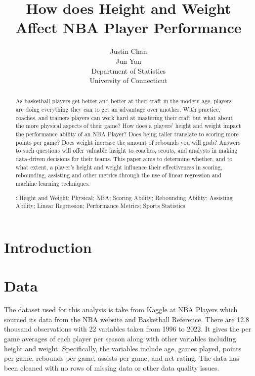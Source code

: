 \documentclass[12pt]{article}
\title{How does Height and Weight Affect NBA Player Performance}
\author{Justin Chan\\
	Jun Yan\\[2ex]
	Department of Statistics\\
	University of Connecticut\\
}
\begin{document}
\maketitle
\doublespace

\begin{abstract}

As basketball players get better and better at their craft in the modern age, players are doing everything 
they can to get an advantage over another. With practice, coaches, and trainers players can work hard at 
mastering their craft but what about the more physical aspects of their game? How does a players' height
and weight impact the performance ability of an NBA Player? Does being taller translate to scoring more
points per game? Does weight increase the amount of rebounds you will grab? Answers to such questions
will offer valuable insight to coaches, scouts, and analysts in making data-driven decisions for their teams.
This paper aims to determine whether, and to what extent, a player's height and weight influence their 
effectiveness in scoring, rebounding, assisting and other metrics through the use of linear regression and
machine learning techniques.

\bigskip
{}:
Height and Weight;
Physical;
NBA;
Scoring Ability;
Rebounding Ability;
Assisting Ability;
Linear Regression;
Performance Metrics;
Sports Statistics

\end{abstract}

\section{Introduction}
\label{sec:intro}

\section{Data}
\label{sec:data}

The dataset used for this analysis is take from Kaggle at \href{https://www.kaggle.com/datasets/justinas/nba-players-data}{NBA Players} 
which sourced its data from the NBA website and Basketball Reference. There are 12.8 thousand observations
with 22 variables taken from 1996 to 2022. It gives the per game averages of each player per season along with
other variables including height and weight. Specifically, the variables include age, games played, points per game,
rebounds per game, assists per game, and net rating. The data has been cleaned with no rows of missing data or
other data quality issues.
\end{document}
